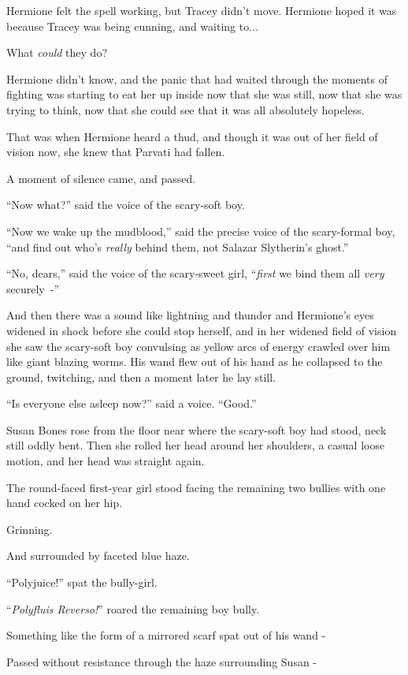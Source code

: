 Hermione felt the spell working, but Tracey didn't move. Hermione hoped it was because Tracey was being cunning, and waiting to...

What \emph{could} they do?

Hermione didn't know, and the panic that had waited through the moments of fighting was starting to eat her up inside now that she was still, now that she was trying to think, now that she could see that it was all absolutely hopeless.

That was when Hermione heard a thud, and though it was out of her field of vision now, she knew that Parvati had fallen.

A moment of silence came, and passed.

``Now what?'' said the voice of the scary-soft boy.

``Now we wake up the mudblood,'' said the precise voice of the scary-formal boy, ``and find out who's \emph{really} behind them, not Salazar Slytherin's ghost.''

``No, dears,'' said the voice of the scary-sweet girl, ``\emph{first} we bind them all \emph{very} securely~-''

And then there was a sound like lightning and thunder and Hermione's eyes widened in shock before she could stop herself, and in her widened field of vision she saw the scary-soft boy convulsing as yellow arcs of energy crawled over him like giant blazing worms. His wand flew out of his hand as he collapsed to the ground, twitching, and then a moment later he lay still.

``Is everyone else asleep now?'' said a voice. ``Good.''

Susan Bones rose from the floor near where the scary-soft boy had stood, neck still oddly bent. Then she rolled her head around her shoulders, a casual loose motion, and her head was straight again.

The round-faced first-year girl stood facing the remaining two bullies with one hand cocked on her hip.

Grinning.

And surrounded by faceted blue haze.

``Polyjuice!'' spat the bully-girl.

``\emph{Polyfluis Reverso!}'' roared the remaining boy bully.

Something like the form of a mirrored scarf spat out of his wand -

Passed without resistance through the haze surrounding Susan -

